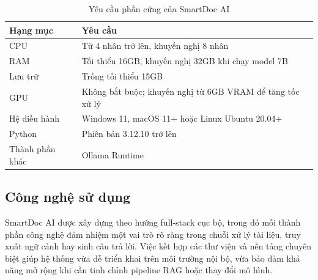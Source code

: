 \documentclass[10pt, conference, a4paper, compsocconf]{IEEEtran}
\newcommand{\smartdoc}{SmartDoc AI}
\begin{document}
\begin{table}[H]
  \renewcommand{\arraystretch}{1.15}
  \caption{Yêu cầu phần cứng của \smartdoc{}}
  \label{tab:requirements}
  \centering
  \footnotesize
  \begin{tabular}{|p{}|p{}|}
    \hline
    \textbf{Hạng mục} & \textbf{Yêu cầu} \\
    \hline
    CPU & Từ 4 nhân trở lên, khuyến nghị 8 nhân \\
    \hline
    RAM & Tối thiểu 16GB, khuyến nghị 32GB khi chạy model 7B \\
    \hline
    Lưu trữ & Trống tối thiểu 15GB \\
    \hline
    GPU & Không bắt buộc; khuyến nghị từ 6GB VRAM để tăng tốc xử lý \\
    \hline
    Hệ điều hành & Windows 11, macOS 11+ hoặc Linux Ubuntu 20.04+ \\
    \hline
    Python & Phiên bản 3.12.10 trở lên \\
    \hline
    Thành phần khác & Ollama Runtime \\
    \hline
  \end{tabular}
\end{table}

\subsection{Công nghệ sử dụng}

\smartdoc{} được xây dựng theo hướng full-stack cục bộ, trong đó mỗi thành phần công nghệ đảm nhiệm một vai trò rõ ràng trong chuỗi xử lý tài liệu, truy xuất ngữ cảnh hay sinh câu trả lời. Việc kết hợp các thư viện và nền tảng chuyên biệt giúp hệ thống vừa dễ triển khai trên môi trường nội bộ, vừa bảo đảm khả năng mở rộng khi cần tinh chỉnh pipeline RAG hoặc thay đổi mô hình.
\end{document}
